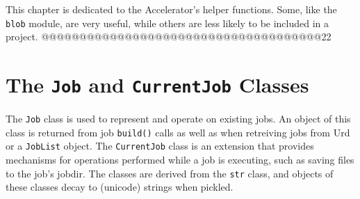 
This chapter is dedicated to the Accelerator's helper functions.
Some, like the \texttt{blob} module, are very useful, while others are
less likely to be included in a project.
@@@@@@@@@@@@@@@@@@@@@@@@@@@@@@@@@@@@@22

\section{The \texttt{Job} and \texttt{CurrentJob} Classes}
The \texttt{Job} class is used to represent and operate on existing
jobs.  An object of this class is returned from job \texttt{build()}
calls as well as when retreiving jobs from Urd or a \texttt{JobList}
object.  The \texttt{CurrentJob} class is an extension that provides
mechanisms for operations performed while a job is executing, such as
saving files to the job's jobdir.  The classes are derived from
the \texttt{str} class, and objects of these classes decay to
(unicode) strings when pickled.

